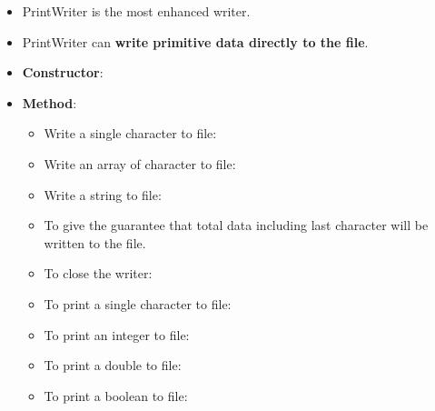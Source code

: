 \setlength{\columnsep}{3pt}
\begin{flushleft}	
	
	\begin{itemize}
		\item PrintWriter is the most enhanced writer.
		\item PrintWriter can \textbf{write primitive data directly to the file}.
		
		\item \textbf{Constructor}:
		\bigskip
		\bigskip
		\newpage
		\item \textbf{Method}:
		\begin{itemize}
			\item Write a single character to file:
			\bigskip
			\item Write an array of character to file:
			\bigskip
		
			\item Write a string to file:
			\bigskip

			\item To give the guarantee that total data including last character will be written to the file.
			\bigskip
			
			\item To close the writer:
			\bigskip

			\item To print a single character to file:
			\bigskip
			
			\item To print an integer to file:
			\bigskip
		
			\item To print a double to file:
			\bigskip
			
			\item To print a boolean to file:
			\bigskip
		

\end{itemize}
\end{itemize}
\end{flushleft}
